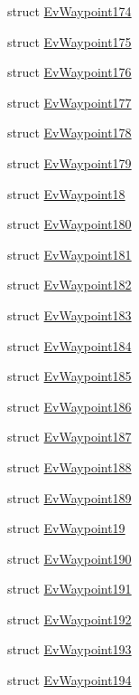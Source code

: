 \begin{DoxyCompactItemize}
\item 
struct \hyperlink{structsmacc_1_1EvWaypoint174}{Ev\+Waypoint174}
\item 
struct \hyperlink{structsmacc_1_1EvWaypoint175}{Ev\+Waypoint175}
\item 
struct \hyperlink{structsmacc_1_1EvWaypoint176}{Ev\+Waypoint176}
\item 
struct \hyperlink{structsmacc_1_1EvWaypoint177}{Ev\+Waypoint177}
\item 
struct \hyperlink{structsmacc_1_1EvWaypoint178}{Ev\+Waypoint178}
\item 
struct \hyperlink{structsmacc_1_1EvWaypoint179}{Ev\+Waypoint179}
\item 
struct \hyperlink{structsmacc_1_1EvWaypoint18}{Ev\+Waypoint18}
\item 
struct \hyperlink{structsmacc_1_1EvWaypoint180}{Ev\+Waypoint180}
\item 
struct \hyperlink{structsmacc_1_1EvWaypoint181}{Ev\+Waypoint181}
\item 
struct \hyperlink{structsmacc_1_1EvWaypoint182}{Ev\+Waypoint182}
\item 
struct \hyperlink{structsmacc_1_1EvWaypoint183}{Ev\+Waypoint183}
\item 
struct \hyperlink{structsmacc_1_1EvWaypoint184}{Ev\+Waypoint184}
\item 
struct \hyperlink{structsmacc_1_1EvWaypoint185}{Ev\+Waypoint185}
\item 
struct \hyperlink{structsmacc_1_1EvWaypoint186}{Ev\+Waypoint186}
\item 
struct \hyperlink{structsmacc_1_1EvWaypoint187}{Ev\+Waypoint187}
\item 
struct \hyperlink{structsmacc_1_1EvWaypoint188}{Ev\+Waypoint188}
\item 
struct \hyperlink{structsmacc_1_1EvWaypoint189}{Ev\+Waypoint189}
\item 
struct \hyperlink{structsmacc_1_1EvWaypoint19}{Ev\+Waypoint19}
\item 
struct \hyperlink{structsmacc_1_1EvWaypoint190}{Ev\+Waypoint190}
\item 
struct \hyperlink{structsmacc_1_1EvWaypoint191}{Ev\+Waypoint191}
\item 
struct \hyperlink{structsmacc_1_1EvWaypoint192}{Ev\+Waypoint192}
\item 
struct \hyperlink{structsmacc_1_1EvWaypoint193}{Ev\+Waypoint193}
\item 
struct \hyperlink{structsmacc_1_1EvWaypoint194}{Ev\+Waypoint194}
\item 

\end{DoxyCompactItemize}
